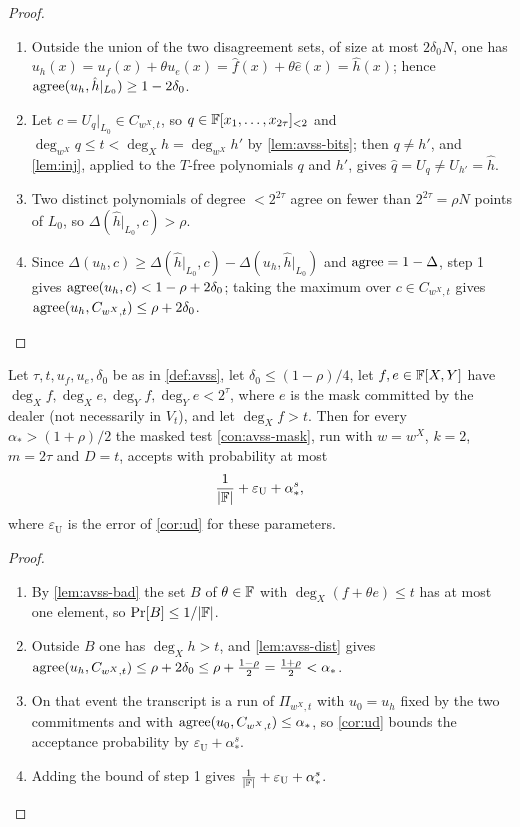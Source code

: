 \begin{proof}
\begin{enumerate}
\item Outside the union of the two disagreement sets, of size at most $2\delta_0N$, one has
$u_h(x)=u_f(x)+\theta u_e(x)=\hat f(x)+\theta\hat e(x)=\hat h(x)$; hence
$\mathrm{agree}(u_h,\hat h|_{L_0})\ge1-2\delta_0$.
\item Let $c=U_q|_{L_0}\in C_{w^X,t}$, so $q\in\mathbb{F}[x_1,\dots,x_{2\tau}]_{<2}$ and
$\deg_{w^X}q\le t<\deg_Xh=\deg_{w^X}h'$ by \cref{lem:avss-bits}; then $q\ne h'$, and
\cref{lem:inj}, applied to the $T$-free polynomials $q$ and $h'$, gives
$\hat q=U_q\ne U_{h'}=\hat h$.
\item Two distinct polynomials of degree $<2^{2\tau}$ agree on fewer than $2^{2\tau}=\rho N$
points of $L_0$, so $\Delta(\hat h|_{L_0},c)>\rho$.
\item Since $\Delta(u_h,c)\ge\Delta(\hat h|_{L_0},c)-\Delta(u_h,\hat h|_{L_0})$ and
$\mathrm{agree}=1-\Delta$, step 1 gives $\mathrm{agree}(u_h,c)<1-\rho+2\delta_0$; taking the maximum over
$c\in C_{w^X,t}$ gives $\mathrm{agree}(u_h,C_{w^X,t})\le\rho+2\delta_0$.
\end{enumerate}
\end{proof}

\begin{proposition}[Soundness]\label{prop:avss-sound}
Let $\tau,t,u_f,u_e,\delta_0$ be as in \cref{def:avss}, let $\delta_0\le(1-\rho)/4$, let
$f,e\in\mathbb{F}[X,Y]$ have $\deg_Xf,\deg_Xe,\deg_Yf,\deg_Ye<2^\tau$, where $e$ is the mask committed by the
dealer (not necessarily in $V_t$), and let $\deg_Xf>t$. Then for every
$\alpha_*>(1+\rho)/2$ the masked test \cref{con:avss-mask}, run with $w=w^X$, $k=2$, $m=2\tau$
and $D=t$, accepts with probability at most
\[
\frac1{|\mathbb{F}|}+\varepsilon_{\mathrm U}+\alpha_*^s,
\]
where $\varepsilon_{\mathrm U}$ is the error of \cref{cor:ud} for these parameters.
\end{proposition}

\begin{proof}
\begin{enumerate}
\item By \cref{lem:avss-bad} the set $B$ of $\theta\in\mathbb{F}$ with $\deg_X(f+\theta e)\le t$ has at
most one element, so $\Pr[B]\le1/|\mathbb{F}|$.
\item Outside $B$ one has $\deg_Xh>t$, and \cref{lem:avss-dist} gives
$\mathrm{agree}(u_h,C_{w^X,t})\le\rho+2\delta_0\le\rho+\frac{1-\rho}2=\frac{1+\rho}2<\alpha_*$.
\item On that event the transcript is a run of $\Pi_{w^X,t}$ with $u_0=u_h$ fixed by the two
commitments and with $\mathrm{agree}(u_0,C_{w^X,t})\le\alpha_*$, so \cref{cor:ud} bounds the acceptance
probability by $\varepsilon_{\mathrm U}+\alpha_*^s$.
\item Adding the bound of step 1 gives $\frac1{|\mathbb{F}|}+\varepsilon_{\mathrm U}+\alpha_*^s$.
\end{enumerate}
\end{proof}

